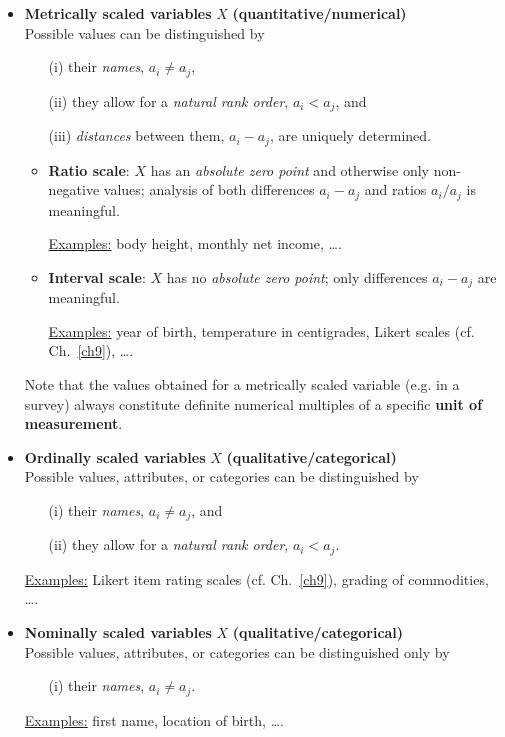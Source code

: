 \begin{itemize}

\item \textbf{Metrically scaled variables} $X$ \hfill
\textbf{(quantitative/numerical)}\\
Possible values can be distinguished by
%
\begin{itemize}
\item[(i)] their \textit{names}, $a_{i} \neq a_{j}$,
\item[(ii)] they allow for a \textit{natural rank order}, $a_{i} < 
a_{j}$, and
\item[(iii)] \textit{distances} between them, $a_{i}-a_{j}$,
are uniquely determined.
\end{itemize}
%
	\begin{itemize}
	\item \textbf{Ratio scale}: $X$ has an \textit{absolute zero
	point} and otherwise only non-negative values;	analysis of both 
	differences	$a_{i}-a_{j}$ and ratios $a_{i}/a_{j}$ is meaningful.
	
	\underline{Examples:} body height, monthly net income, \ldots.
	
	\item \textbf{Interval scale}: $X$ has no \textit{absolute
	zero point}; only differences $a_{i}-a_{j}$
	are meaningful.
	
	\underline{Examples:} year of birth, temperature in centigrades,
	Likert scales (cf. Ch.~\ref{ch9}), \ldots.
	\end{itemize}
	
Note that the values obtained for a metrically scaled variable 
(e.g. in a survey) always constitute definite numerical 
multiples of a specific \textbf{unit of measurement}.

\item \textbf{Ordinally scaled variables} $X$ \hfill
\textbf{(qualitative/categorical)}\\
Possible values, attributes, or categories can be distinguished by
%
\begin{itemize}
\item[(i)] their \textit{names}, $a_{i} \neq a_{j}$, and
\item[(ii)] they allow for a \textit{natural rank order}, $a_{i} 
< a_{j}$.
\end{itemize}
%
\underline{Examples:} Likert item rating scales (cf. 
Ch.~\ref{ch9}), grading of commodities, \ldots.

\item \textbf{Nominally scaled variables} $X$ \hfill
\textbf{(qualitative/categorical)}\\
Possible values, attributes, or categories can be distinguished 
only by
%
\begin{itemize}
\item[(i)] their \textit{names}, $a_{i} \neq a_{j}$.
\end{itemize}
%
\underline{Examples:} first name, location of birth, \ldots.

\end{itemize}

